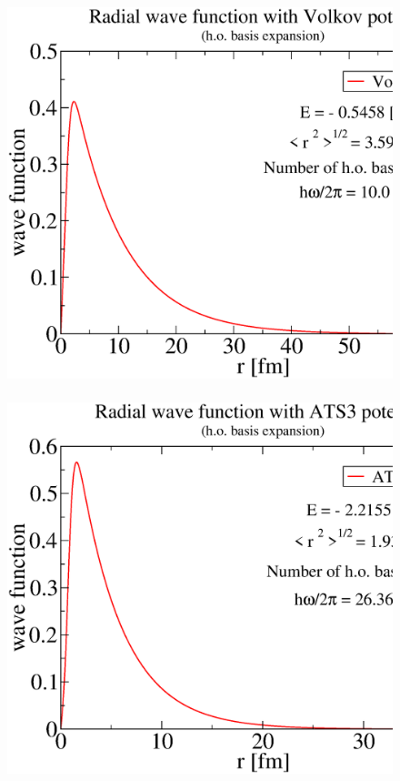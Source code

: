 \documentclass[12pt,a4paper,titlepage]{jarticle}
\begin{document}
\begin{figure}[H]
\begin{center}
\includegraphics[width=140mm,height=110mm]{wf_ho2.eps}
\end{center}
\end{figure}

\begin{figure}[H]
\begin{center}
\includegraphics[width=140mm,height=110mm]{wf_ho3.eps}
\end{center}
\end{figure}
\end{document}
